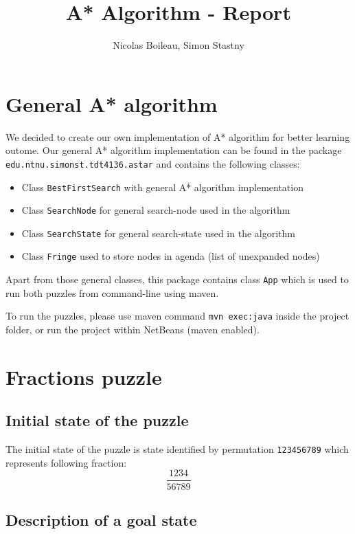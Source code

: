 \documentclass{article}
\begin{document}
\title{A* Algorithm - Report}
\author{Nicolas Boileau, Simon Stastny}

\maketitle

\section{General A* algorithm}

We decided to create our own implementation of A* algorithm for better learning
outome. Our general A* algorithm implementation can be found in the package
\texttt{edu.ntnu.simonst.tdt4136.astar} and contains the following classes:

\begin{itemize}
  \item Class \texttt{BestFirstSearch} with general A* algorithm implementation
  \item Class \texttt{SearchNode} for general search-node used in the algorithm
  \item Class \texttt{SearchState} for general search-state used in the
  algorithm
  \item Class \texttt{Fringe} used to store nodes in agenda (list of unexpanded
  nodes)
\end{itemize} 

Apart from those general classes, this package contains class \texttt{App} which
is used to run both puzzles from command-line using maven.

To run the puzzles, please use maven command \texttt{mvn exec:java} inside the
project folder, or run the project within NetBeans (maven enabled).

\section{Fractions puzzle}

\subsection{Initial state of the puzzle}

The initial state of the puzzle is state identified by permutation
\texttt{123456789} which represents following fraction:
\[
 \frac{1234}{56789}
\]

\subsection{Description of a goal state} \label{fracgoal}
\end{document}

